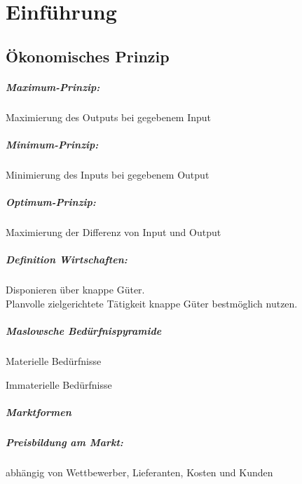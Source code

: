 \chapter{Einführung}
\section{Ökonomisches Prinzip}
\paragraph{Maximum-Prinzip:} Maximierung des Outputs bei gegebenem Input
\paragraph{Minimum-Prinzip:} Minimierung des Inputs bei gegebenem Output
\paragraph{Optimum-Prinzip:} Maximierung der Differenz von Input und Output

\paragraph{Definition Wirtschaften:} Disponieren über knappe Güter.\\
Planvolle zielgerichtete Tätigkeit knappe Güter bestmöglich nutzen.

\paragraph{Maslowsche Bedürfnispyramide}
\begin{compactitem}
	\item Materielle Bedürfnisse
	\item Immaterielle Bedürfnisse
\end{compactitem}


\clearpage
\paragraph{Marktformen}

\paragraph{Preisbildung am Markt:} abhängig von Wettbewerber, Lieferanten, Kosten und Kunden

